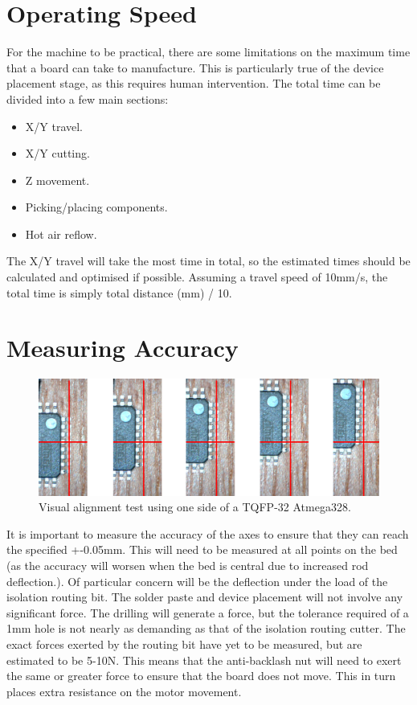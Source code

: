 \section{Operating Speed}
For the machine to be practical, there are some limitations on the maximum time that a board can take to manufacture. This is particularly true of the device placement stage, as this requires
human intervention. The total time can be divided into a few main sections:

\begin{itemize}
	\item	X/Y travel.
	\item	X/Y cutting.
	\item	Z movement.
	\item	Picking/placing components.
	\item	Hot air reflow.
\end{itemize}

The X/Y travel will take the most time in total, so the estimated times should be calculated and optimised if possible. Assuming a travel speed of 10mm/s, the total
time is simply total distance (mm) / 10.

\section{Measuring Accuracy}
\begin{figure}[ht!]
\centering
\includegraphics[width=170mm]{resources/registration.png}
\caption{Visual alignment test using one side of a TQFP-32 Atmega328.}
\label{overflow}
\end{figure}

It is important to measure the accuracy of the axes to ensure that they can reach the specified +-0.05mm. This will need to be measured
at all points on the bed (as the accuracy will worsen when the bed is central due to increased rod deflection.). Of particular concern will be
the deflection under the load of the isolation routing bit. The solder paste and device placement will not involve any significant force. The 
drilling will generate a force, but the tolerance required of a 1mm hole is not nearly as demanding as that of the isolation routing cutter.
The exact forces exerted by the routing bit have yet to be measured, but are estimated to be 5-10N. This means that the anti-backlash nut
will need to exert the same or greater force to ensure that the board does not move. This in turn places extra resistance on the motor movement.

